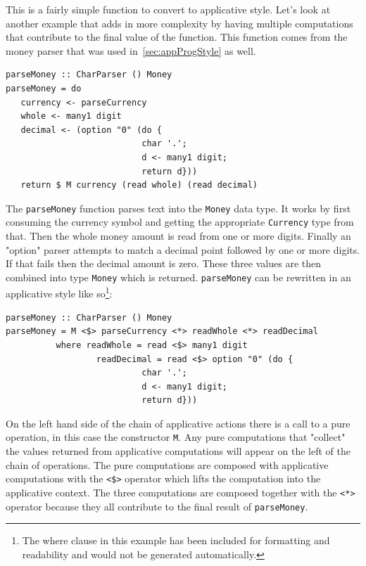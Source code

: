 This is a fairly simple function to convert to applicative style. Let's look at another example that adds in more complexity by having multiple computations that contribute to the final value of the function. This function comes from the money parser that was used in~\ref{sec:appProgStyle} as well. 
\pagebreak
\begin{lstlisting}[frame=tlrb]
parseMoney :: CharParser () Money
parseMoney = do
   currency <- parseCurrency 
   whole <- many1 digit
   decimal <- (option "0" (do { 
                           char '.';
                           d <- many1 digit;
                           return d}))
   return $ M currency (read whole) (read decimal)
\end{lstlisting}

The \texttt{parseMoney} function parses text into the \texttt{Money} data type. It works by first consuming the currency symbol and getting the appropriate \texttt{Currency} type from that. Then the whole money amount is read from one or more digits. Finally an "option" parser attempts to match a decimal point followed by one or more digits. If that fails then the decimal amount is zero. These three values are then combined into type \texttt{Money} which is returned. \texttt{parseMoney} can be rewritten in an applicative style like so\footnote{The where clause in this example has been included for formatting and readability and would not be generated automatically.}:

\begin{lstlisting}[frame=tlrb]
parseMoney :: CharParser () Money
parseMoney = M <$> parseCurrency <*> readWhole <*> readDecimal
          where readWhole = read <$> many1 digit
                  readDecimal = read <$> option "0" (do { 
                           char '.';
                           d <- many1 digit;
                           return d}))
\end{lstlisting}

On the left hand side of the chain of applicative actions there is a call to a pure operation, in this case the constructor \texttt{M}. Any pure computations that "collect" the values returned from applicative computations will appear on the left of the chain of operations. The pure computations are composed with applicative computations with the \texttt{<\$>} operator which lifts the computation into the applicative context. The three computations are composed together with the \texttt{<*>} operator because they all contribute to the final result of \texttt{parseMoney}.

